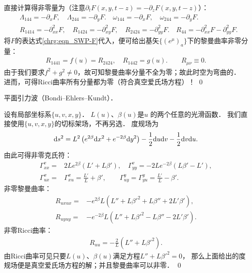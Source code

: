 直接计算得非零量为（注意$\partial_t F(x,y,t-z)=-\partial_z F(x,y,t-z)$）：
\begin{align*}
&\Lambda_{144} = -\partial_x F,\quad
\Lambda_{244} = -\partial_y F.\quad
\omega_{144} = -\partial_x F,\quad
\omega_{244} = -\partial_y F. \\
&R_{1414} = -\partial^{2}_{xx} F,\quad
R_{1424} = -\partial^2_{xy}F,\quad 
R_{2424} = -\partial^2_{yy}F. \quad
R_{44} = -\partial^2_{xx}F -\partial^2_{yy}F .
\end{align*}
将$F$的表达式\eqref{chrg:eqn_SWP-F}代入，便可给出基矢$\{(e^\mu)_a\}$下的黎曼曲率非零分量：
\begin{align*}
	R_{1441}= f(u) = R_{2424},\quad R_{1442} = g(u) .
	\qquad R_{\mu\nu}\equiv 0 .
\end{align*}
由于我们要求$f^2+g^2 \neq 0$，故可知黎曼曲率分量不全为零；故此时空为弯曲的．
进而，可得Ricci曲率所有分量都为零（符合真空爱氏场方程）！
\qed

\begin{example}\label{chrg:exm_BondiPlane}
	平面引力波（Bondi--Ehlers--Kundt）．
\end{example}

设有局部坐标系$\{u,v, x, y\}$．
$L(u)$、$\beta(u)$是$u$ 的两个任意的光滑函数．
我们直接使用$\{u, v, x, y\}$的切标架场，不再另选．
度规场为
\begin{equation*}
	{\rm d}s^2 = L^2\left( e^{2\beta}{\rm d}x^2 +e^{-2\beta}{\rm d}y^2 \right) 
	- \frac{1}{2}{\rm d}u{\rm d}v - \frac{1}{2}{\rm d}v{\rm d}u.
\end{equation*}
由此可得非零克氏符：
\begin{align*}
	\Gamma^v_{xx} =& 2 L e^{2 \beta } \left(L'+L \beta'\right),\quad
	\Gamma^v_{yy} = -2 L e^{-2\beta } \left(L\beta'-L'\right) ,\\
	\Gamma^x_{ux} =& \Gamma^x_{xu} =  \frac{L'}{L}+\beta', \qquad
	\Gamma^y_{uy} =  \Gamma^y_{yu} = \frac{L'}{L}-\beta' .
\end{align*}
非零黎曼曲率：
\begin{align*}
	R_{uxux} =& -e^{ 2 \beta} L \left(L''+ L\beta'^2 + L\beta'' +2 L' \beta'\right),\\
	R_{uyuy} =& -e^{-2 \beta} L \left(L''+ L\beta'^2 - L \beta''-2 L' \beta'\right).
\end{align*}
非零Ricci曲率：
\begin{align*}
	R_{uu} = -\frac{2}{L} \left(L''+L \beta'^2\right) .
\end{align*}
由Ricci曲率可见只要$L(u)$、$\beta(u)$满足方程$L''+L\beta'^2=0$，
那么上面给出的度规场便是真空爱氏场方程的解；并且黎曼曲率可以非零．
\qed



